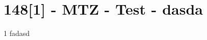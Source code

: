 \section{148[1] - MTZ - Test - dasda}

\begin{langesbeispiel}\item[1] %
fadasd

\end{langesbeispiel}